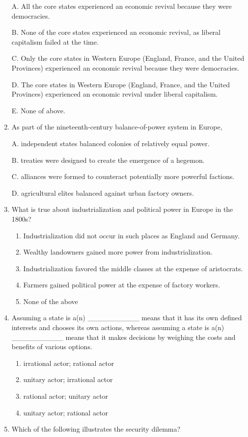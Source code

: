 \documentclass[
]{book}
\begin{document}
\begin{enumerate}
  A. All the core states experienced an economic revival because they were democracies.

  B. None of the core states experienced an economic revival, as liberal capitalism failed at the time.

  C. Only the core states in Western Europe (England, France, and the United Provinces) experienced an economic revival because they were democracies.

  D. The core states in Western Europe (England, France, and the United Provinces) experienced an economic revival under liberal capitalism.

  E. None of above.
\item
  As part of the nineteenth-century balance-of-power system in Europe,

  A. independent states balanced colonies of relatively equal power.

  B. treaties were designed to create the emergence of a hegemon.

  C. alliances were formed to counteract potentially more powerful factions.

  D. agricultural elites balanced against urban factory owners.
\item
  What is true about industrialization and political power in Europe in the 1800s?

  \begin{enumerate}
  \def\labelenumii{\Alph{enumii}.}
  \item
    Industrialization did not occur in such places as England and Germany.
  \item
    Wealthy landowners gained more power from industrialization.
  \item
    Industrialization favored the middle classes at the expense of aristocrats.
  \item
    Farmers gained political power at the expense of factory workers.
  \item
    None of the above
  \end{enumerate}
\item
  Assuming a state is a(n) \_\_\_\_\_\_\_\_\_\_ means that it has its own defined interests and chooses its own actions, whereas assuming a state is a(n) \_\_\_\_\_\_\_\_\_\_ means that it makes decisions by weighing the costs and benefits of various options.

  \begin{enumerate}
  \def\labelenumii{\Alph{enumii}.}
  \item
    irrational actor; rational actor
  \item
    unitary actor; irrational actor
  \item
    rational actor; unitary actor
  \item
    unitary actor; rational actor
  \end{enumerate}
\item
  Which of the following illustrates the security dilemma?


\end{enumerate}
\end{document}
